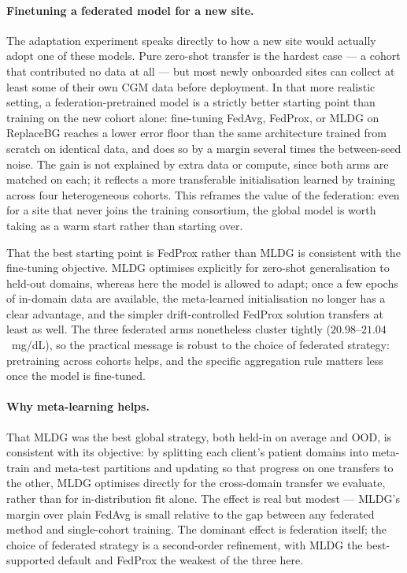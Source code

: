 \documentclass[10pt,letterpaper]{article}
\begin{document}
\paragraph{Finetuning a federated model for a new site.}
The adaptation experiment speaks directly to how a new site would actually adopt
one of these models. Pure zero-shot transfer is the hardest case --- a cohort
that contributed no data at all --- but most newly onboarded sites can collect at
least some of their own CGM data before deployment. In that more realistic
setting, a federation-pretrained model is a strictly better starting point than
training on the new cohort alone: fine-tuning FedAvg, FedProx, or MLDG on
ReplaceBG reaches a lower error floor than the same architecture trained from
scratch on identical data, and does so by a margin several times the between-seed
noise. The gain is not explained by extra data or compute, since both arms are
matched on each; it reflects a more transferable initialisation learned by
training across four heterogeneous cohorts. This reframes the value of the
federation: even for a site that never joins the training consortium, the global
model is worth taking as a warm start rather than starting over.

That the best starting point is FedProx rather than MLDG is consistent with the
fine-tuning objective. MLDG optimises explicitly for zero-shot generalisation to
held-out domains, whereas here the model is allowed to adapt; once a few epochs of
in-domain data are available, the meta-learned initialisation no longer has a
clear advantage, and the simpler drift-controlled FedProx solution transfers at
least as well. The three federated arms nonetheless cluster tightly
($20.98$--$21.04$~mg/dL), so the practical message is robust to the choice of
federated strategy: pretraining across cohorts helps, and the specific aggregation
rule matters less once the model is fine-tuned.

\paragraph{Why meta-learning helps.} That MLDG was the best global strategy, both
held-in on average and OOD, is consistent with its objective: by splitting each
client's patient domains into meta-train and meta-test partitions and updating so
that progress on one transfers to the other, MLDG optimises directly for the
cross-domain transfer we evaluate, rather than for in-distribution fit alone. The
effect is real but modest --- MLDG's margin over plain FedAvg is small relative to
the gap between any federated method and single-cohort training. The dominant
effect is federation itself; the choice of federated strategy is a second-order
refinement, with MLDG the best-supported default and FedProx the weakest of the
three here.
\end{document}
